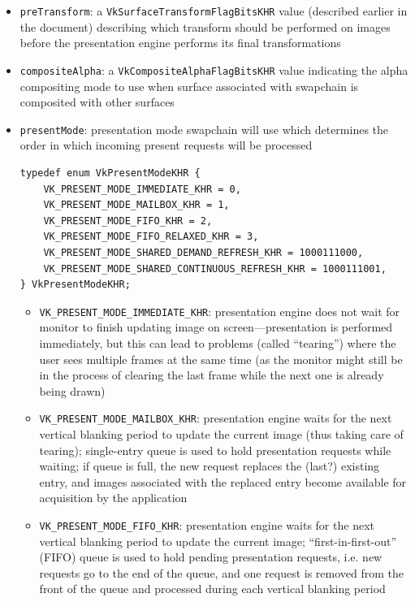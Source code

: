 \documentclass[12pt,letterpaper]{article}
\newcommand{\inquotes}[1]{``#1''}	%
\newcommand{\cil}[1]{\texttt{#1}}
\begin{document}
\begin{itemize}
        \item \cil{preTransform}: a \cil{VkSurfaceTransformFlagBitsKHR} value (described earlier in the document) describing which transform should be performed on images before the presentation engine performs its final transformations
        
        \item \cil{compositeAlpha}: a \cil{VkCompositeAlphaFlagBitsKHR} value indicating the alpha compositing mode to use when surface associated with swapchain is composited with other surfaces
        
        \item \cil{presentMode}: presentation mode swapchain will use which determines the order in which incoming present requests will be processed 
            \begin{verbatim}
typedef enum VkPresentModeKHR {
    VK_PRESENT_MODE_IMMEDIATE_KHR = 0,
    VK_PRESENT_MODE_MAILBOX_KHR = 1,
    VK_PRESENT_MODE_FIFO_KHR = 2,
    VK_PRESENT_MODE_FIFO_RELAXED_KHR = 3,
    VK_PRESENT_MODE_SHARED_DEMAND_REFRESH_KHR = 1000111000,
    VK_PRESENT_MODE_SHARED_CONTINUOUS_REFRESH_KHR = 1000111001,
} VkPresentModeKHR;
            \end{verbatim}
            \begin{itemize}
                \item \cil{VK_PRESENT_MODE_IMMEDIATE_KHR}: presentation engine does not wait for monitor to finish updating image on screen---presentation is performed immediately, but this can lead to problems (called \inquotes{tearing}) where the user sees multiple frames at the same time (as the monitor might still be in the process of clearing the last frame while the next one is already being drawn)
                
                \item \cil{VK_PRESENT_MODE_MAILBOX_KHR}: presentation engine waits for the next vertical blanking period to update the current image (thus taking care of tearing); single-entry queue is used to hold presentation requests while waiting; if queue is full, the new request replaces the (last?) existing entry, and images associated with the replaced entry become available for acquisition by the application
                
                \item \cil{VK_PRESENT_MODE_FIFO_KHR}: presentation engine waits for the next vertical blanking period to update the current image; \inquotes{first-in-first-out} (FIFO) queue is used to hold pending presentation requests, i.e. new requests go to the end of the queue, and one request is removed from the front of the queue and processed during each vertical blanking period
                

\end{itemize}
\end{itemize}
\end{document}
